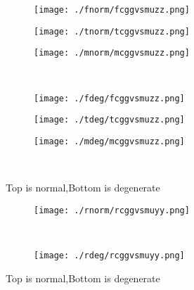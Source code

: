 \documentclass[aps,floats,floatfix,nofootinbib]{revtex4-1}
\begin{document}
\begin{center}
\begin{figure}
\begin{subfigure}{0.3\textwidth}
\texttt{[image: ./fnorm/fcggvsmuzz.png]}
\label{}
\end{subfigure}
\begin{subfigure}{0.3\textwidth}
\texttt{[image: ./tnorm/tcggvsmuzz.png]}
\label{}
\end{subfigure}
\begin{subfigure}{0.3\textwidth}
\texttt{[image: ./mnorm/mcggvsmuzz.png]}
\label{}
\end{subfigure}\\
\begin{subfigure}{0.3\textwidth}
\texttt{[image: ./fdeg/fcggvsmuzz.png]}
\label{}
\end{subfigure}
\begin{subfigure}{0.3\textwidth}
\texttt{[image: ./tdeg/tcggvsmuzz.png]}
\label{}
\end{subfigure}
\begin{subfigure}{0.3\textwidth}
\texttt{[image: ./mdeg/mcggvsmuzz.png]}
\label{}
\end{subfigure}\\
\caption{Top is normal,Bottom is degenerate}
\end{figure}
\end{center}

\begin{center}
\begin{figure}
\begin{subfigure}{1.0\textwidth}
\texttt{[image: ./rnorm/rcggvsmuyy.png]}
\label{}
\end{subfigure}\\
\begin{subfigure}{1.0\textwidth}
\texttt{[image: ./rdeg/rcggvsmuyy.png]}
\label{}
\end{subfigure}
\caption{Top is normal,Bottom is degenerate}
\end{figure}
\end{center}
\end{document}
